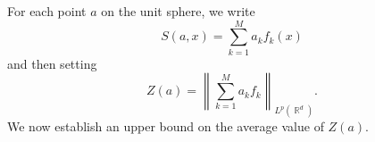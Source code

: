 \documentclass[dvipsnames,letterpaper,12pt]{article}
\numberwithin{equation}{section}
\DeclareMathOperator{\RR}{\mathbb{R}}
\numberwithin{theorem}{section}
\begin{document}
\begin{comment}






If $\phi(N(x - \xi_i))$
%
\[ \sup_i \sum_j |\langle f_i, f_j \rangle| \lesssim_s 1 \]

\end{comment}

For each point $a$ on the unit sphere, we write
%
\[ S(a,x) = \sum_{k = 1}^M a_k f_k(x) \]
%
and then setting
%
\[ Z(a) = \left\| \sum_{k = 1}^M a_k f_k \right\|_{L^p(\RR^d)}. \]
%
We now establish an upper bound on the average value of $Z(a)$.
\end{document}
